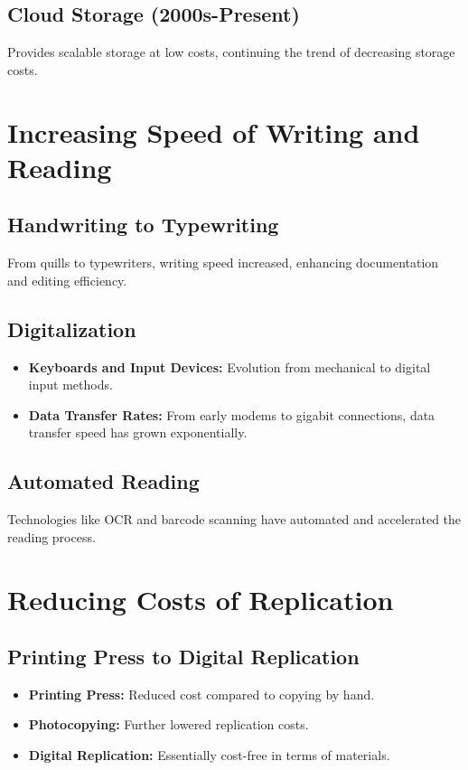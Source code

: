 \documentclass[10pt,titlepage]{book}
\begin{document}
\subsection{Cloud Storage (2000s-Present)}
Provides scalable storage at low costs, continuing the trend of decreasing storage costs.

\section{Increasing Speed of Writing and Reading}

\subsection{Handwriting to Typewriting}
From quills to typewriters, writing speed increased, enhancing documentation and editing efficiency.

\subsection{Digitalization}
\begin{itemize}
    \item \textbf{Keyboards and Input Devices:} Evolution from mechanical to digital input methods.
    \item \textbf{Data Transfer Rates:} From early modems to gigabit connections, data transfer speed has grown exponentially.
\end{itemize}

\subsection{Automated Reading}
Technologies like OCR and barcode scanning have automated and accelerated the reading process.

\section{Reducing Costs of Replication}

\subsection{Printing Press to Digital Replication}
\begin{itemize}
    \item \textbf{Printing Press:} Reduced cost compared to copying by hand.
    \item \textbf{Photocopying:} Further lowered replication costs.
    \item \textbf{Digital Replication:} Essentially cost-free in terms of materials.
\end{itemize}
\end{document}
